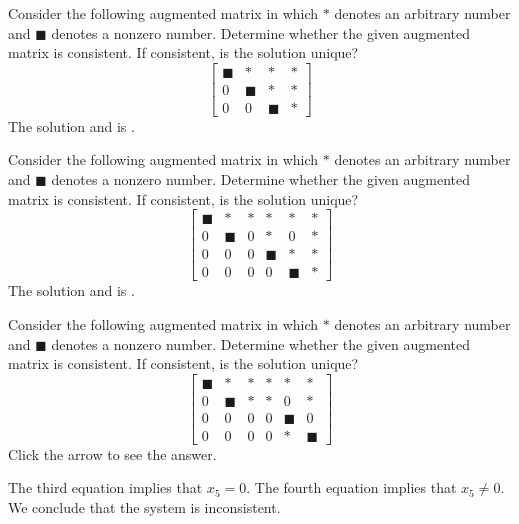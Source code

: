 \documentclass{ximera}
\begin{document}
\begin{problem}\label{prb:2.5}
Consider the following augmented matrix in which $\ast $ denotes an arbitrary
number and $\blacksquare $ denotes a nonzero number. Determine whether the
given augmented matrix is consistent. If consistent, is the solution unique?
\begin{equation*}
\left[
\begin{array}{ccc|c}
\blacksquare & \ast & \ast & \ast \\
0 & \blacksquare & \ast & \ast \\
0 & 0 & \blacksquare & \ast
\end{array}
\right]
\end{equation*}
The solution  and is .
\end{problem}


\begin{problem}\label{prb:2.6}
Consider the following augmented matrix in which $\ast $ denotes an arbitrary
number and $\blacksquare $ denotes a nonzero number. Determine whether the
given augmented matrix is consistent. If consistent, is the solution unique?
\begin{equation*}
\left[
\begin{array}{ccccc|c}
\blacksquare & \ast & \ast & \ast & \ast & \ast \\
0 & \blacksquare & 0 & \ast & 0 & \ast \\
0 & 0 & 0 & \blacksquare & \ast & \ast \\
0 & 0 & 0 & 0 & \blacksquare & \ast
\end{array}
\right]
\end{equation*}
The solution  and is .
\end{problem}

\begin{problem}\label{prb:2.7}
Consider the following augmented matrix in which $\ast $ denotes an arbitrary
number and $\blacksquare $ denotes a nonzero number. Determine whether the
given augmented matrix is consistent. If consistent, is the solution unique?
\begin{equation*}
\left[
\begin{array}{ccccc|c}
\blacksquare & \ast & \ast & \ast & \ast & \ast \\
0 & \blacksquare & \ast & \ast & 0 & \ast \\
0 & 0 & 0 & 0 & \blacksquare & 0 \\
0 & 0 & 0 & 0 & \ast & \blacksquare
\end{array}
\right]
\end{equation*}
Click the arrow to see the answer. 
\begin{expandable}
The third equation implies that $x_5 = 0$.  The fourth equation implies that $x_5 \ne 0$.  We conclude that the system is inconsistent.
\end{expandable}
\end{problem}
\end{document}
